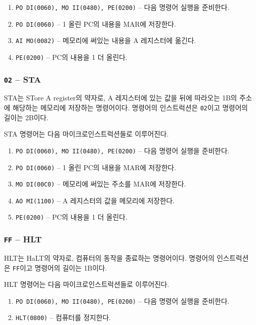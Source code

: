 \documentclass{article}
\begin{document}
\begin{enumerate}
    \item \texttt{PO DI(0060), MO II(0480), PE(0200)} -- 다음 명령어 실행을 준비한다.
    \item \texttt{PO DI(0060)} -- 1 올린 PC의 내용을 MAR에 저장한다.
    \item \texttt{AI MO(0082)} -- 메모리에 써있는 내용을 A 레지스터에 옮긴다.
    \item \texttt{PE(0200)} -- PC의 내용을 1 더 올린다.
\end{enumerate}

\subsubsection{\texttt{02} -- STA}

STA는 STore A register의 약자로, A 레지스터에 있는 값을
뒤에 따라오는 1B의 주소에 해당하는 메모리에 저장하는 명령어이다.
명령어의 인스트럭션은 \texttt{02}이고 명령어의 길이는 2B이다.

STA 명령어는 다음 마이크로인스트럭션들로 이루어진다.

\begin{enumerate}
    \item \texttt{PO DI(0060), MO II(0480), PE(0200)} -- 다음 명령어 실행을 준비한다.
    \item \texttt{PO DI(0060)} -- 1 올린 PC의 내용을 MAR에 저장한다.
    \item \texttt{MO DI(00C0)} -- 메모리에 써있는 주소를 MAR에 저장한다.
    \item \texttt{AO MI(1100)} -- A 레지스터의 값을 메모리에 저장한다.
    \item \texttt{PE(0200)} -- PC의 내용을 1 더 올린다.
\end{enumerate}

\subsubsection{\texttt{FF} -- HLT}

HLT는 HaLT의 약자로, 컴퓨터의 동작을 종료하는 명령어이다.
명령어의 인스트럭션은 \texttt{FF}이고 명령어의 길이는 1B이다.

HLT 명령어는 다음 마이크로인스트럭션들로 이루어진다.

\begin{enumerate}
    \item \texttt{PO DI(0060), MO II(0480), PE(0200)} -- 다음 명령어 실행을 준비한다.
    \item \texttt{HLT(0800)} -- 컴퓨터를 정지한다.
\end{enumerate}
\end{document}
